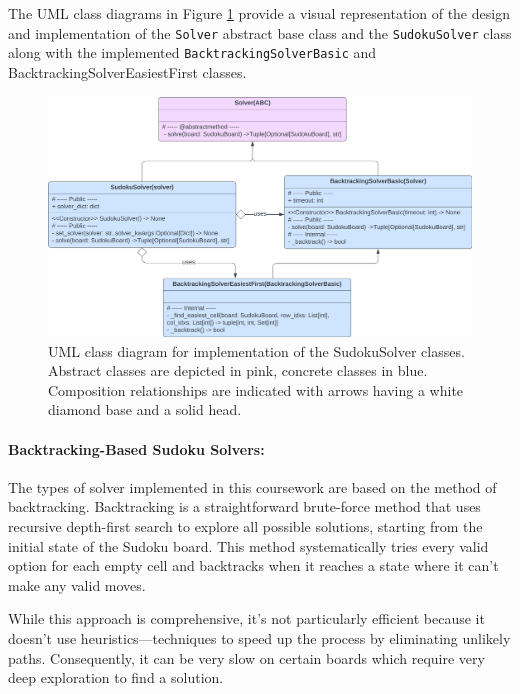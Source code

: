 \documentclass[11pt]{article}
\begin{document}
\begin{itemize}
The UML class diagrams in Figure \ref{fig:sudoku_solver_uml} provide a visual representation of the design and implementation of the \texttt{Solver} abstract base class and the \texttt{SudokuSolver} class along with the implemented \texttt{BacktrackingSolverBasic} and {BacktrackingSolverEasiestFirst} classes.

\begin{figure}[H]
    \centering
    \includegraphics[width=1\textwidth]{figs/UML_sudoku_solver.png}
    \caption{UML class diagram for implementation of the SudokuSolver classes. Abstract classes are depicted in pink, concrete classes in blue. Composition relationships are indicated with arrows having a white diamond base and a solid head.}
    \label{fig:sudoku_solver_uml}
\end{figure}

\paragraph{Backtracking-Based Sudoku Solvers:}

The types of solver implemented in this coursework are based on the method of backtracking. Backtracking is a straightforward brute-force method that uses recursive depth-first search to explore all possible solutions, starting from the initial state of the Sudoku board. This method systematically tries every valid option for each empty cell and backtracks when it reaches a state where it can't make any valid moves.

While this approach is comprehensive, it's not particularly efficient because it doesn't use heuristics—techniques to speed up the process by eliminating unlikely paths. Consequently, it can be very slow on certain boards which require very deep exploration to find a solution. 


\end{itemize}
\end{document}
